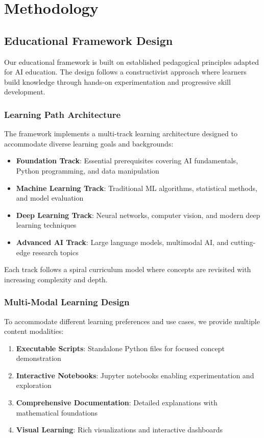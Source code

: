 \section{Methodology}
\label{sec:methodology}

\subsection{Educational Framework Design}

Our educational framework is built on established pedagogical principles adapted for AI education. The design follows a constructivist approach \cite{piaget1977equilibration} where learners build knowledge through hands-on experimentation and progressive skill development.

\subsubsection{Learning Path Architecture}

The framework implements a multi-track learning architecture designed to accommodate diverse learning goals and backgrounds:

\begin{itemize}
    \item \textbf{Foundation Track}: Essential prerequisites covering AI fundamentals, Python programming, and data manipulation
    \item \textbf{Machine Learning Track}: Traditional ML algorithms, statistical methods, and model evaluation
    \item \textbf{Deep Learning Track}: Neural networks, computer vision, and modern deep learning techniques
    \item \textbf{Advanced AI Track}: Large language models, multimodal AI, and cutting-edge research topics
\end{itemize}

Each track follows a spiral curriculum model \cite{bruner1960process} where concepts are revisited with increasing complexity and depth.

\subsubsection{Multi-Modal Learning Design}

To accommodate different learning preferences and use cases, we provide multiple content modalities:

\begin{enumerate}
    \item \textbf{Executable Scripts}: Standalone Python files for focused concept demonstration
    \item \textbf{Interactive Notebooks}: Jupyter notebooks enabling experimentation and exploration
    \item \textbf{Comprehensive Documentation}: Detailed explanations with mathematical foundations
    \item \textbf{Visual Learning}: Rich visualizations and interactive dashboards
\end{enumerate}

